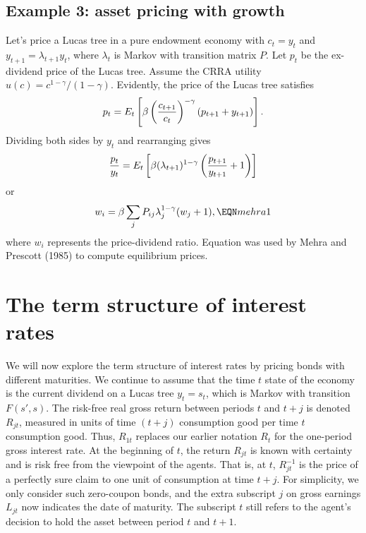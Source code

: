 \subsection{Example 3: asset pricing with growth}

Let's price a Lucas tree in a pure endowment economy
with $c_t = y_t$ and  $y_{t+1} = \lambda_{t+1} y_t$, where
$\lambda_t$ is Markov with transition
matrix $P$.    Let $p_t$ be the ex-dividend price of
the Lucas tree.   Assume the CRRA utility
$u(c) = c^{1-\gamma} / (1-\gamma)$.
Evidently, the price of the Lucas tree satisfies
$$ p_t = E_t\left[\beta \left({c_{t+1} \over c_t}\right)^{-\gamma}
      \left( p_{t+1} + y_{t+1}  \right) \right] .$$
Dividing both sides by $y_t$ and rearranging gives
$$ {p_t \over y_t} = E_t \left[ \beta (\lambda_{t+1})^{1 - \gamma}
    \left( { p_{t+1} \over y_{t+1} } + 1\right) \right] $$
or
$$ w_i = \beta \sum_j  P_{ij} \lambda_j^{1 -\gamma} (w_j+1) ,
    \EQN mehra1 $$
where $w_i$ represents the price-dividend ratio. Equation  was
used by Mehra and Prescott (1985) to compute equilibrium prices.

\section{The term structure of interest rates}

We will now explore the term structure of interest rates by pricing
bonds with different maturities.  We continue to assume that
the time $t$ state of the economy is the current dividend
on a Lucas tree $y_t = s_t$, which is Markov with
transition $F(s',s)$.  The risk-free real gross return between
periods $t$ and $t+j$ is denoted $R_{jt}$, measured in units
of time $(t+j)$ consumption good per time $t$ consumption good.
Thus, $R_{1t}$ replaces our earlier notation $R_{t}$ for the
one-period gross interest rate.  At the beginning of $t$, the return
$R_{jt}$ is known with certainty and is risk free from the viewpoint
of the agents.  That is, at $t$, $R_{jt}^{-1}$ is the price of a perfectly
sure claim to one unit of consumption at time $t+j$.  For simplicity, we
only consider such zero-coupon bonds, and the extra subscript $j$ on gross
earnings $L_{jt}$ now indicates the date of maturity.  The subscript $t$ still
refers to the agent's decision to hold the asset between period $t$ and $t+1$.

